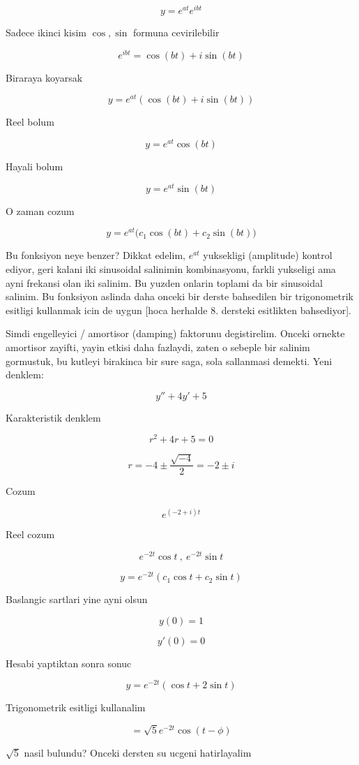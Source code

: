 \documentclass[12pt,fleqn]{article}\usepackage{../common}
\begin{document}
\[ y = e^{at} e^{ibt} \]

Sadece ikinci kisim $\cos, \sin$ formuna cevirilebilir

\[ e^{ibt} = \cos(bt) + i\sin(bt) \]

Biraraya koyarsak

\[ y = e^{at} (\cos(bt) + i\sin(bt)) \]

Reel bolum

\[ y = e^{at}\cos(bt) \] 

Hayali bolum

\[ y = e^{at}\sin(bt) \] 

O zaman cozum

\[ y = e^{at} \bigg( c_1 \cos(bt) + c_2 \sin(bt) \bigg) \]

Bu fonksiyon neye benzer? Dikkat edelim, $e^{at}$ yuksekligi (amplitude)
kontrol ediyor, geri kalani iki sinusoidal salinimin kombinasyonu, farkli
yukseligi ama ayni frekansi olan iki salinim. Bu yuzden onlarin toplami da
bir sinusoidal salinim. Bu fonksiyon aslinda daha onceki bir derste
bahsedilen bir trigonometrik esitligi kullanmak icin de uygun [hoca
herhalde 8. dersteki esitlikten bahsediyor].

Simdi engelleyici / amortisor (damping) faktorunu degistirelim. Onceki
ornekte amortisor zayifti, yayin etkisi daha fazlaydi, zaten o sebeple bir
salinim gormustuk, bu kutleyi birakinca bir sure saga, sola sallanmasi
demekti. Yeni denklem:

\[ y'' + 4y' + 5 \]

Karakteristik denklem

\[ r^2 + 4r + 5 = 0 \]

\[ r = -4 \pm \frac{\sqrt{-4}}{2} = -2 \pm i\]

Cozum

\[ e^{(-2+i)t} \]

Reel cozum

\[ e^{-2t}\cos t \ , \ e^{-2t}\sin t\]

\[ y = e^{-2t} (c_1 \cos t + c_2 \sin t) \]

Baslangic sartlari yine ayni olsun

\[ y(0) = 1 \]

\[ y'(0) = 0 \]

Hesabi yaptiktan sonra sonuc

\[ y = e^{-2t} (\cos t + 2 \sin t) \]

Trigonometrik esitligi kullanalim

\[ = \sqrt{5}e^{-2t} \cos (t - \phi) \]

$\sqrt{5}$ nasil bulundu? Onceki dersten su ucgeni hatirlayalim
\end{document}
